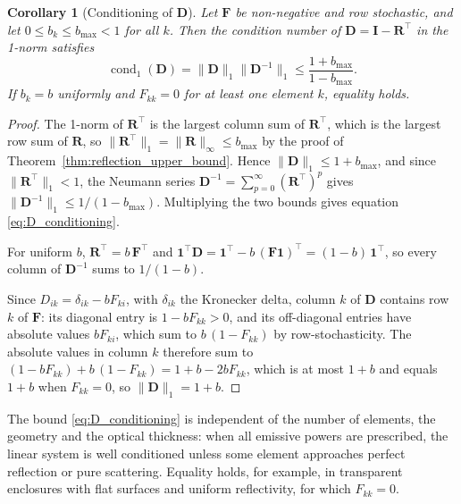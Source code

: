 \documentclass[preprint,1p,times]{elsarticle}
\theoremstyle{plain}
\newtheorem{corollary}[theorem]{Corollary}
\theoremstyle{definition}
\theoremstyle{remark}
\begin{document}
\begin{corollary}[Conditioning of $\mathbf{D}$]
\label{cor:D_conditioning}
Let $\mathbf{F}$ be non-negative and row stochastic, and let $0 \leq b_k \leq b_{\max} < 1$ for all $k$. Then the condition number of $\mathbf{D} = \mathbf{I} - \mathbf{R}^\top$ in the 1-norm satisfies
\begin{equation}
\operatorname{cond}_1(\mathbf{D}) = \|\mathbf{D}\|_1 \|\mathbf{D}^{-1}\|_1 \leq \frac{1 + b_{\max}}{1 - b_{\max}} .
\label{eq:D_conditioning}
\end{equation}
If $b_k = b$ uniformly and $F_{kk} = 0$ for at least one element $k$, equality holds.
\end{corollary}

\begin{proof}
The 1-norm of $\mathbf{R}^\top$ is the largest column sum of $\mathbf{R}^\top$, which is the largest row sum of $\mathbf{R}$, so $\|\mathbf{R}^\top\|_1 = \|\mathbf{R}\|_\infty \leq b_{\max}$ by the proof of Theorem~\ref{thm:reflection_upper_bound}. Hence $\|\mathbf{D}\|_1 \leq 1 + b_{\max}$, and since $\|\mathbf{R}^\top\|_1 < 1$, the Neumann series $\mathbf{D}^{-1} = \sum_{p=0}^{\infty} (\mathbf{R}^\top)^p$ gives $\|\mathbf{D}^{-1}\|_1 \leq 1/(1 - b_{\max})$. Multiplying the two bounds gives equation \eqref{eq:D_conditioning}.

For uniform $b$, $\mathbf{R}^\top = b\,\mathbf{F}^\top$ and $\mathbf{1}^\top \mathbf{D} = \mathbf{1}^\top - b\,(\mathbf{F}\mathbf{1})^\top = (1-b)\,\mathbf{1}^\top$, so every column of $\mathbf{D}^{-1}$ sums to $1/(1-b)$.

Since $D_{ik} = \delta_{ik} - b F_{ki}$, with $\delta_{ik}$ the Kronecker delta, column $k$ of $\mathbf{D}$ contains row $k$ of $\mathbf{F}$: its diagonal entry is $1 - bF_{kk} > 0$, and its off-diagonal entries have absolute values $bF_{ki}$, which sum to $b\,(1 - F_{kk})$ by row-stochasticity. The absolute values in column $k$ therefore sum to $(1 - b F_{kk}) + b\,(1 - F_{kk}) = 1 + b - 2bF_{kk}$, which is at most $1 + b$ and equals $1 + b$ when $F_{kk} = 0$, so $\|\mathbf{D}\|_1 = 1 + b$.
\end{proof}

The bound \eqref{eq:D_conditioning} is independent of the number of elements, the geometry and the optical thickness: when all emissive powers are prescribed, the linear system is well conditioned unless some element approaches perfect reflection or pure scattering. Equality holds, for example, in transparent enclosures with flat surfaces and uniform reflectivity, for which $F_{kk} = 0$. 
\end{document}

